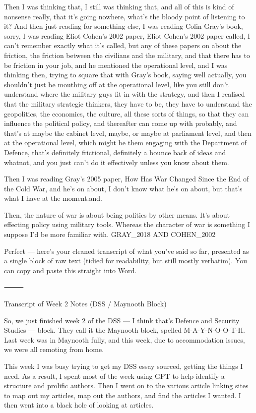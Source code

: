 Then I was thinking that, I still was thinking that, and all of this is kind of nonsense really, that it’s going nowhere, what’s the bloody point of listening to it? And then just reading for something else, I was reading Colin Gray’s book, sorry, I was reading Eliot Cohen’s 2002 paper, Eliot Cohen’s 2002 paper called, I can’t remember exactly what it’s called, but any of these papers on about the friction, the friction between the civilians and the military, and that there has to be friction in your job, and he mentioned the operational level, and I was thinking then, trying to square that with Gray’s book, saying well actually, you shouldn’t just be mouthing off at the operational level, like you still don’t understand where the military guys fit in with the strategy, and then I realised that the military strategic thinkers, they have to be, they have to understand the geopolitics, the economics, the culture, all these sorts of things, so that they can influence the political policy, and thereafter can come up with probably, and that’s at maybe the cabinet level, maybe, or maybe at parliament level, and then at the operational level, which might be them engaging with the Department of Defence, that’s definitely frictional, definitely a bounce back of ideas and whatnot, and you just can’t do it effectively unless you know about them.

Then I was reading Gray’s 2005 paper, How Has War Changed Since the End of the Cold War, and he’s on about, I don’t know what he’s on about, but that’s what I have at the moment.and.

Then, the nature of war is about being politics by other means. It's about effecting policy using military tools. Whereas the character of war is something I suppose I'd be more familiar with. GRAY_2018 AND COHEN_2002	


Perfect — here’s your cleaned transcript of what you’ve said so far, presented as a single block of raw text (tidied for readability, but still mostly verbatim). You can copy and paste this straight into Word.

⸻

Transcript of Week 2 Notes (DSS / Maynooth Block)

So, we just finished week 2 of the DSS — I think that’s Defence and Security Studies — block. They call it the Maynooth block, spelled M-A-Y-N-O-O-T-H. Last week was in Maynooth fully, and this week, due to accommodation issues, we were all remoting from home.

This week I was busy trying to get my DSS essay sourced, getting the things I need. As a result, I spent most of the week using GPT to help identify a structure and prolific authors. Then I went on to the various article linking sites to map out my articles, map out the authors, and find the articles I wanted. I then went into a black hole of looking at articles.

